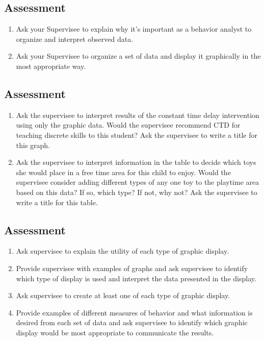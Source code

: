 \subsection{Assessment}
\begin{enumerate}
\item Ask your Supervisee to explain why it's important as a behavior analyst to organize and interpret observed data. 
\item Ask your Supervisee to organize a set of data and display it graphically in the most appropriate way. 
\end{enumerate}
%
\subsection{Assessment}
\begin{enumerate}
\item Ask the supervisee to interpret results of the constant time delay intervention using only the graphic data. Would the supervisee recommend CTD for teaching discrete skills to this student? Ask the supervisee to write a title for this graph.
\item Ask the supervisee to interpret information in the table to decide which toys she would place in a free time area for this child to enjoy. Would the supervisee consider adding different types of any one toy to the playtime area based on this data? If so, which type? If not, why not? Ask the supervisee to write a title for this table.
%
\end{enumerate}
%
\subsection{Assessment}
\begin{enumerate}
\item Ask supervisee to explain the utility of each type of graphic display.
\item Provide supervisee with examples of graphs and ask supervisee to identify which type of display is used and interpret the data presented in the display.
\item Ask supervisee to create at least one of each type of graphic display.
\item Provide examples of different measures of behavior and what information is desired from each set of data and ask supervisee to identify which graphic display would be most appropriate to communicate the results.
%
\end{enumerate}
%
